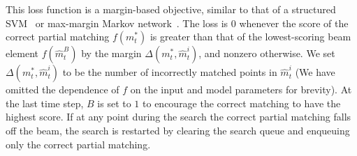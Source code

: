 \documentclass[10pt,twocolumn,letterpaper]{article}
\begin{document}
This loss function is a margin-based objective, similar to that of a structured SVM~\cite{Tsochantaridis2004SupportVM} or max-margin Markov network~\cite{Taskar2003MaxMarginMN}. %
The loss is 0 whenever the score of the correct partial matching $f(m^*_t)$ is greater than that of the lowest-scoring beam element $f(\hat{m}^B_t)$ by the margin $\Delta(m^*_t, \hat{m}^i_t)$, and nonzero otherwise. We set $\Delta(m^*_t, \hat{m}^i_t)$ to be the number of incorrectly matched points in $\hat{m}^i_t$ (We have omitted the dependence of $f$ on the input and model parameters for brevity). At the last time step, $B$ is set to $1$ to encourage the correct matching to have the highest score. If at any point during the search the correct partial matching falls off the beam, the search is restarted by clearing the search queue and enqueuing only the correct partial matching.
\end{document}
